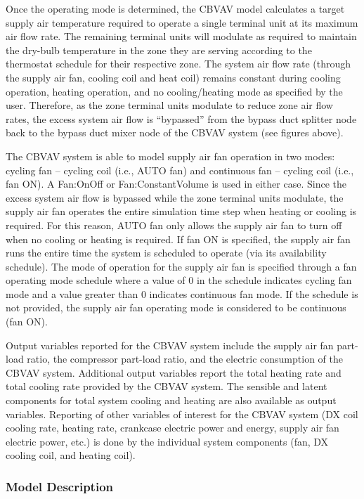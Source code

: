 Once the operating mode is determined, the CBVAV model calculates a target supply air temperature required to operate a single terminal unit at its maximum air flow rate. The remaining terminal units will modulate as required to maintain the dry-bulb temperature in the zone they are serving according to the thermostat schedule for their respective zone. The system air flow rate (through the supply air fan, cooling coil and heat coil) remains constant during cooling operation, heating operation, and no cooling/heating mode as specified by the user. Therefore, as the zone terminal units modulate to reduce zone air flow rates, the excess system air flow is ``bypassed'' from the bypass duct splitter node back to the bypass duct mixer node of the CBVAV system (see figures above).

The CBVAV system is able to model supply air fan operation in two modes: cycling fan -- cycling coil (i.e., AUTO fan) and continuous fan -- cycling coil (i.e., fan ON). A Fan:OnOff or Fan:ConstantVolume is used in either case. Since the excess system air flow is bypassed while the zone terminal units modulate, the supply air fan operates the entire simulation time step when heating or cooling is required. For this reason, AUTO fan only allows the supply air fan to turn off when no cooling or heating is required. If fan ON is specified, the supply air fan runs the entire time the system is scheduled to operate (via its availability schedule). The mode of operation for the supply air fan is specified through a fan operating mode schedule where a value of 0 in the schedule indicates cycling fan mode and a value greater than 0 indicates continuous fan mode. If the schedule is not provided, the supply air fan operating mode is considered to be continuous (fan ON).

Output variables reported for the CBVAV system include the supply air fan part-load ratio, the compressor part-load ratio, and the electric consumption of the CBVAV system. Additional output variables report the total heating rate and total cooling rate provided by the CBVAV system. The sensible and latent components for total system cooling and heating are also available as output variables. Reporting of other variables of interest for the CBVAV system (DX coil cooling rate, heating rate, crankcase electric power and energy, supply air fan electric power, etc.) is done by the individual system components (fan, DX cooling coil, and heating coil).

\subsubsection{Model Description}\label{model-description-2}

